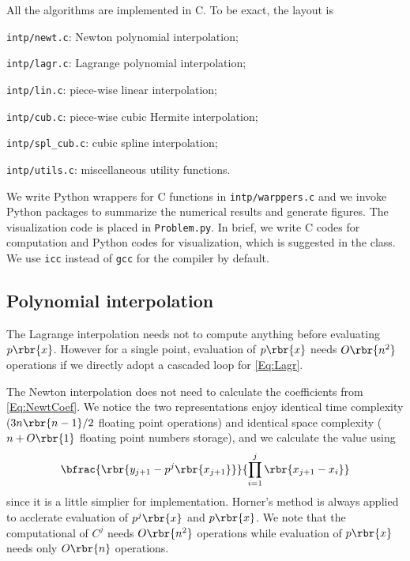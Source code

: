 \documentclass[english, nochinese]{pnote}
\begin{document}
All the algorithms are implemented in C. To be exact, the layout is
\begin{partlist}
\item \verb"intp/newt.c": Newton polynomial interpolation;
\item \verb"intp/lagr.c": Lagrange polynomial interpolation;
\item \verb"intp/lin.c": piece-wise linear interpolation;
\item \verb"intp/cub.c": piece-wise cubic Hermite interpolation;
\item \verb"intp/spl_cub.c": cubic spline interpolation;
\item \verb"intp/utils.c": miscellaneous utility functions.
\end{partlist}
We write Python wrappers for C functions in \verb"intp/warppers.c" and we invoke Python packages to summarize the numerical results and generate figures. The visualization code is placed in \verb"Problem.py". In brief, {\color{red} we write C codes for computation and Python codes for visualization, which is suggested in the class}. We use \verb"icc" instead of \verb"gcc" for the compiler by default.

\subsection{Polynomial interpolation}

The Lagrange interpolation needs not to compute anything before evaluating $ p \rbr{x} $. However for a single point, evaluation of $ p \rbr{x} $ needs $ O \rbr{n^2} $ operations if we directly adopt a cascaded loop for \eqref{Eq:Lagr}.

The Newton interpolation does not need to calculate the coefficients from \eqref{Eq:NewtCoef}. We notice the two representations enjoy identical time complexity ($ 3 n \rbr{ n - 1 } / 2 $ floating point operations) and identical space complexity ($ n + O \rbr{1} $ floating point numbers storage), and we calculate the value using
\begin{equation} \label{Eq:NewtRec}
\bfrac{\rbr{ y_{ j + 1 } - p^j \rbr{x_{ j + 1 }} }}{ \prod_{ i = 1 }^j \rbr{ x_{ j + 1 } - x_i } }
\end{equation}
since it is a little simplier for implementation. Horner's method is always applied to acclerate evaluation of $ p^j \rbr{x} $ and $ p \rbr{x} $. We note that the computational of $C^j$ needs $ O \rbr{n^2} $ operations while evaluation of $ p \rbr{x} $ needs only $ O \rbr{n} $ operations.
\end{document}
